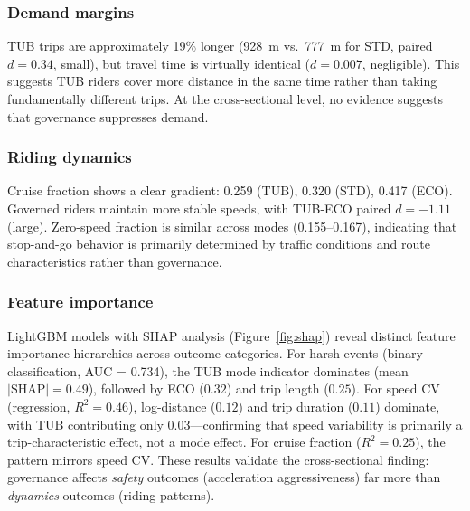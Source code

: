 \subsubsection{Demand margins}

TUB trips are approximately 19\% longer (928~m vs.~777~m for STD, paired $d = 0.34$, small), but travel time is virtually identical ($d = 0.007$, negligible). This suggests TUB riders cover more distance in the same time rather than taking fundamentally different trips. At the cross-sectional level, no evidence suggests that governance suppresses demand.

\subsubsection{Riding dynamics}

Cruise fraction shows a clear gradient: 0.259 (TUB), 0.320 (STD), 0.417 (ECO). Governed riders maintain more stable speeds, with TUB-ECO paired $d = -1.11$ (large). Zero-speed fraction is similar across modes (0.155--0.167), indicating that stop-and-go behavior is primarily determined by traffic conditions and route characteristics rather than governance.

\subsubsection{Feature importance}

LightGBM models with SHAP analysis (Figure~\ref{fig:shap}) reveal distinct feature importance hierarchies across outcome categories. For harsh events (binary classification, AUC = 0.734), the TUB mode indicator dominates (mean $|\text{SHAP}| = 0.49$), followed by ECO ($0.32$) and trip length ($0.25$). For speed CV (regression, $R^2 = 0.46$), log-distance ($0.12$) and trip duration ($0.11$) dominate, with TUB contributing only $0.03$---confirming that speed variability is primarily a trip-characteristic effect, not a mode effect. For cruise fraction ($R^2 = 0.25$), the pattern mirrors speed CV. These results validate the cross-sectional finding: governance affects \textit{safety} outcomes (acceleration aggressiveness) far more than \textit{dynamics} outcomes (riding patterns).


